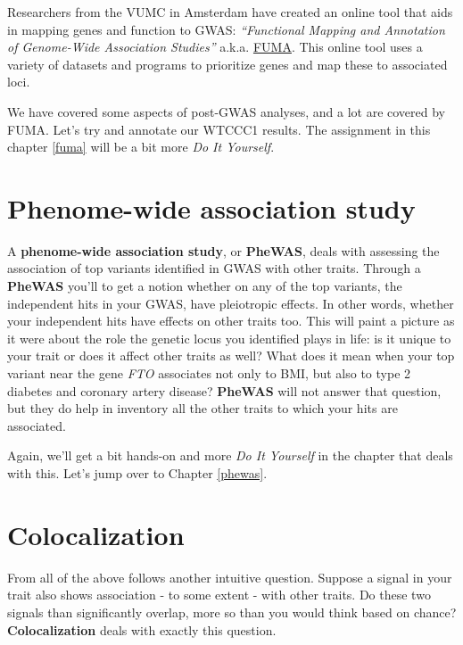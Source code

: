 \documentclass[
]{book}
\begin{document}
Researchers from the VUMC in Amsterdam have created an online tool that aids in mapping genes and function to GWAS: \emph{``Functional Mapping and Annotation of Genome-Wide Association Studies''} a.k.a. \href{https://fuma.ctglab.nl}{FUMA}. This online tool uses a variety of datasets and programs to prioritize genes and map these to associated loci.

We have covered some aspects of post-GWAS analyses, and a lot are covered by FUMA. Let's try and annotate our WTCCC1 results. The assignment in this chapter \ref{fuma} will be a bit more \emph{Do It Yourself}.

\hypertarget{phenome-wide-association-study}{%
\section{Phenome-wide association study}\label{phenome-wide-association-study}}

A \textbf{phenome-wide association study}, or \textbf{PheWAS}, deals with assessing the association of top variants identified in GWAS with other traits. Through a \textbf{PheWAS} you'll to get a notion whether on any of the top variants, the independent hits in your GWAS, have pleiotropic effects. In other words, whether your independent hits have effects on other traits too. This will paint a picture as it were about the role the genetic locus you identified plays in life: is it unique to your trait or does it affect other traits as well? What does it mean when your top variant near the gene \emph{FTO} associates not only to BMI, but also to type 2 diabetes and coronary artery disease? \textbf{PheWAS} will not answer that question, but they do help in inventory all the other traits to which your hits are associated.

Again, we'll get a bit hands-on and more \emph{Do It Yourself} in the chapter that deals with this. Let's jump over to Chapter \ref{phewas}.

\hypertarget{colocalization}{%
\section{Colocalization}\label{colocalization}}

From all of the above follows another intuitive question. Suppose a signal in your trait also shows association - to some extent - with other traits. Do these two signals than significantly overlap, more so than you would think based on chance? \textbf{Colocalization} deals with exactly this question.
\end{document}
